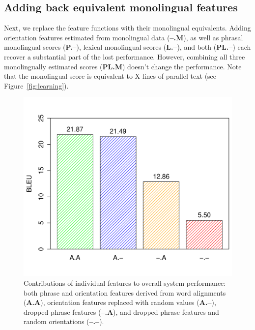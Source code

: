 \documentclass[11pt]{article}
\newcommand{\mnote}[1]{\marginpar{%
  \vskip-\baselineskip
  \raggedright\footnotesize
  \itshape\hrule\smallskip\tiny{#1}\par\smallskip\hrule}}
\newcommand{\mtodo}[1]{\mnote{\textcolor{red}{#1}}}
\newcommand{\figref}[1]{Figure~\ref{#1}}
\begin{document}
\subsection{Adding back equivalent monolingual features}

Next, we replace the feature functions with their monolingual equivalents.  Adding orientation features estimated from monolingual data ({\bf --.M}), as well as phrasal monolingual scores ({\bf P.--}), lexical monolingual scores ({\bf L.--}), and both ({\bf PL.--}) each recover a substantial part of the lost performance.  However, combining all three monolingually estimated scores ({\bf PL.M}) doesn't change the performance. \mtodo{Fix here and in legend when new results are in.}  Note that the monolingual score is equivalent to X lines of parallel text (see \figref{fig:learning}).  \mtodo{Fill in from learning curve.}

\begin{figure}[t]
\begin{center}
\includegraphics[width=\linewidth]{../figures/lesion/lesions.pdf}
\caption{Contributions of individual features to overall system performance: both phrase and orientation features derived from word alignments ({\bf A.A}), orientation features replaced with random values ({\bf A.--}), dropped phrase features ({\bf --.A}), and dropped phrase features and random orientations ({\bf --.--}).}
\label{fig:lesion}
\end{center}
\vskip -0.2in
\end{figure}
\end{document}
